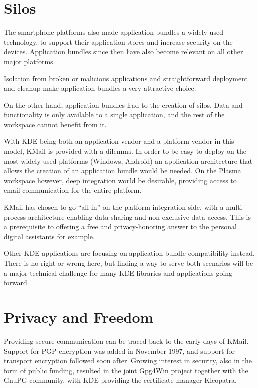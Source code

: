 \section*{Silos}

The smartphone platforms also made application bundles a widely-used technology, to support their application stores and increase security on the devices. Application bundles since then have also become relevant on all other major platforms.

Isolation from broken or malicious applications and straightforward deployment and cleanup make application bundles a very attractive choice.

On the other hand, application bundles lead to the creation of silos. Data and functionality is only available to a single application, and the rest of the workspace cannot benefit from it.

With KDE being both an application vendor and a platform vendor in this model, KMail is provided with a dilemma. In order to be easy to deploy on the most widely-used platforms (Windows, Android) an application architecture that allows the creation of an application bundle would be needed. On the Plasma workspace however, deep integration would be desirable, providing access to email communication for the entire platform.

KMail has chosen to go “all in” on the platform integration side, with a multi-process architecture enabling data sharing and non-exclusive data access. This is a prerequisite to offering a free and privacy-honoring answer to the personal digital assistants for example.

Other KDE applications are focusing on application bundle compatibility instead. There is no right or wrong here, but finding a way to serve both scenarios will be a major technical challenge for many KDE libraries and applications going forward.

\section*{Privacy and Freedom}

Providing secure communication can be traced back to the early days of KMail. Support for PGP encryption was added in November 1997, and support for transport encryption followed soon after. Growing interest in security, also in the form of public funding, resulted in the joint Gpg4Win project together with the GnuPG community, with KDE providing the certificate manager Kleopatra.

